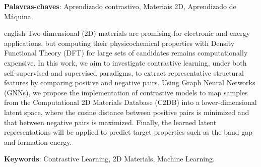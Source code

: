 \documentclass[	12pt, Times, openright, twoside, a4paper, english, brazil]{abntex2}
\begin{document}
\begin{resumo}
 \vspace{\onelineskip}
    
 \noindent
 \textbf{Palavras-chaves}: Aprendizado contrastivo, Materiais 2D, Aprendizado de Máquina.
\end{resumo}

\begin{resumo}[Abstract]
 \begin{otherlanguage*}{english}
Two-dimensional (2D) materials are promising for electronic and energy applications, but computing their physicochemical properties with Density Functional Theory (DFT) for large sets of candidates remains computationally expensive. In this work, we aim to investigate contrastive learning, under both self-supervised and supervised paradigms, to extract representative structural features by comparing positive and negative pairs. Using Graph Neural Networks (GNNs), we propose the implementation of contrastive models to map samples from the Computational 2D Materials Database (C2DB) into a lower-dimensional latent space, where the cosine distance between positive pairs is minimized and that between negative pairs is maximized. Finally, the learned latent representations will be applied to predict target properties such as the band gap and formation energy.
   \vspace{\onelineskip}
 
   \noindent 
   \textbf{Keywords}: Contrastive Learning, 2D Materials, Machine Learning.
 \end{otherlanguage*}
\end{resumo}


\end{document}
